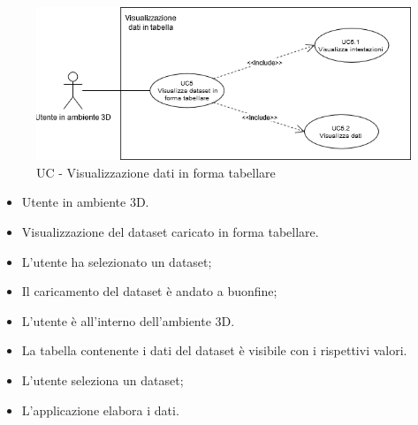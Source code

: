 \begin{figure}[h!]
    \centering
    \includegraphics[scale=0.7]{template/images/UC5.png}
    \caption{UC - Visualizzazione dati in forma tabellare}
\end{figure}
\UCdsc
    { %
        \begin{itemize}
            \item Utente in ambiente 3D.
        \end{itemize}
    }
    { %
        \begin{itemize}
            \item Visualizzazione del dataset caricato in forma tabellare.
        \end{itemize}
    }
    { %
        \begin{itemize}
            \item L'utente ha selezionato un dataset;
            \item Il caricamento del dataset è andato a buonfine;
            \item L'utente è all'interno dell'ambiente 3D.
        \end{itemize}
    }
    { %
        \begin{itemize}
            \item La tabella contenente i dati del dataset è visibile con i rispettivi valori.
        \end{itemize}
    }
    { %
        \begin{itemize}
            \item L'utente seleziona un dataset;
            \item L'applicazione elabora i dati.
        \end{itemize}
    }


